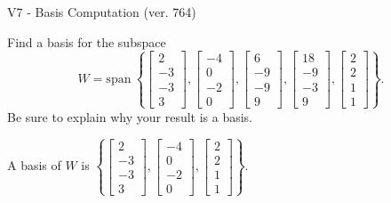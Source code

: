\begin{exercise}
  \begin{exerciseTitle}V7 - Basis Computation (ver. 764)\end{exerciseTitle}
  \begin{exerciseStatement}
    Find a basis for the subspace 
\[W=\mathrm{span}\ \left\{\left[\begin{array}{r}
2 \\
-3 \\
-3 \\
3
\end{array}\right] , \left[\begin{array}{r}
-4 \\
0 \\
-2 \\
0
\end{array}\right] , \left[\begin{array}{r}
6 \\
-9 \\
-9 \\
9
\end{array}\right] , \left[\begin{array}{r}
18 \\
-9 \\
-3 \\
9
\end{array}\right] , \left[\begin{array}{r}
2 \\
2 \\
1 \\
1
\end{array}\right]\right\}.\]
 Be sure to explain why your result is a basis.


  \end{exerciseStatement}
  \begin{exerciseAnswer}
   A basis of \(W\) is  \(\left\{\left[\begin{array}{r}
2 \\
-3 \\
-3 \\
3
\end{array}\right] , \left[\begin{array}{r}
-4 \\
0 \\
-2 \\
0
\end{array}\right] , \left[\begin{array}{r}
2 \\
2 \\
1 \\
1
\end{array}\right]\right\}\).
  


  \end{exerciseAnswer}
\end{exercise}